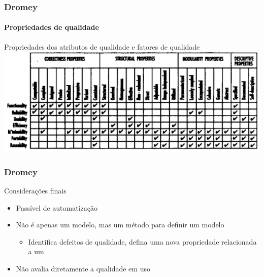 \begin{frame}
	\frametitle{Dromey}
	\framesubtitle{Propriedades de qualidade}
	
 	\begin{block:fact}{Propriedades dos atributos de qualidade e fatores de qualidade}
		\centering
		\includegraphics[width=\textwidth]{software-engineering/project-management/product/dromey/dromey-properties_X_quality}
	\end{block:fact}
\end{frame}



\begin{frame}
	\frametitle{Dromey}
	
	\begin{block:fact}{Considerações finais}
		\begin{itemize}
			\item Passível de automatização
			
			\item Não é apenas um modelo, mas um método para definir um modelo
			\begin{itemize}
				\item Identifica defeitos de qualidade, defina uma nova propriedade
				relacionada a um 
			\end{itemize}
			
			\item Não avalia diretamente a qualidade em uso
		\end{itemize}
	\end{block:fact}
\end{frame}

